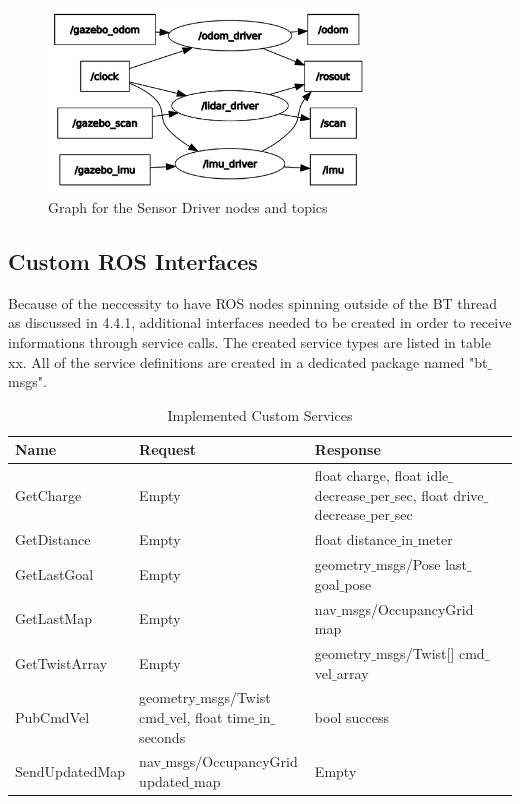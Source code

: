 \begin{figure}
	\includegraphics[width=0.75\textwidth]{images/rqt_graph_sensor_drivers.png}
	\caption{Graph for the Sensor Driver nodes and topics}
\end{figure}


\subsection{Custom ROS Interfaces}

Because of the neccessity to have ROS nodes spinning outside of the BT thread as discussed in 4.4.1, additional interfaces needed to be created in order to receive informations through service calls. The created service types are listed in table xx. All of the service definitions are created in a dedicated package named "bt$\_$msgs". 

\begin{table}[h!]
	\caption{Implemented Custom Services}
	\begin{tabular}{ | m{} | m{}| m{} | m{} |} 
  	\hline
  	Name & Request & Response \\ 
  	\hline
  	GetCharge & Empty & float charge, float idle$\_$decrease$\_$per$\_$sec, float drive$\_$decrease$\_$per$\_$sec \\
  	\hline
  	GetDistance & Empty & float distance$\_$in$\_$meter\\ 
  	\hline
  	GetLastGoal & Empty & geometry$\_$msgs/Pose last$\_$goal$\_$pose \\ 
  	\hline
  	GetLastMap & Empty & nav$\_$msgs/OccupancyGrid map \\
  	\hline
  	GetTwistArray & Empty & geometry$\_$msgs/Twist[] cmd$\_$vel$\_$array\\
  	\hline  	
  	PubCmdVel & geometry$\_$msgs/Twist cmd$\_$vel, float time$\_$in$\_$seconds & bool success \\
  	\hline
  	SendUpdatedMap & nav$\_$msgs/OccupancyGrid updated$\_$map & Empty \\
  	\hline
	\end{tabular}
\end{table}





